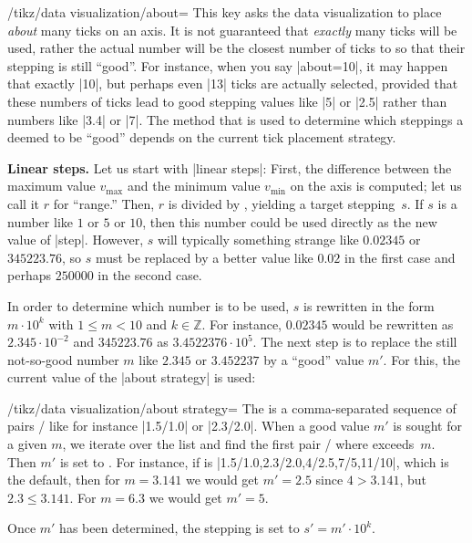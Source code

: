 \begin{key}{/tikz/data visualization/about=}
  This key asks the data visualization to place \emph{about}
   many ticks on an axis. It is not guaranteed that
  \emph{exactly}  many ticks will be used, rather the
  actual number will be the closest number of ticks to 
  so that their stepping is still ``good''. For instance, when you say
  |about=10|, it may happen that exactly |10|, but perhaps even |13| ticks are
  actually selected, provided that these numbers of ticks lead to good
  stepping values like |5| or |2.5| rather than numbers like |3.4| or
  |7|. The method that is used to determine which steppings a deemed to
  be ``good'' depends on the current tick placement strategy.

  \medskip
  \textbf{Linear steps.}
  Let us start with |linear steps|: First, the difference between the
  maximum value $v_{\max}$ and the minimum value $v_{\min}$ on the
  axis is computed; let us call it $r$ for ``range.'' Then, $r$ is
  divided by ,
  yielding a target stepping~$s$. If $s$ is a number like $1$ or $5$
  or $10$, then this number could be used directly as the new value of
  |step|. However, $s$ will typically something strange like $0.02345$
  or $345223.76$, so $s$ must be replaced by a better value like $0.02$
  in the first case and perhaps $250000$ in the second case.

  In order to determine which number is to be used, $s$ is rewritten
  in the form $m \cdot 10^k$ with $1 \le m < 10$ and $k \in \mathbb
  Z$. For instance, $0.02345$ would be rewritten as $2.345 \cdot
  10^{-2}$ and $345223.76$ as $3.4522376 \cdot 10^5$. The next step
  is to replace the still not-so-good number $m$ like $2.345$ or
  $3.452237$ by a ``good'' value $m'$. For this, the current value of
  the |about strategy| is used:
  \begin{key}{/tikz/data visualization/about strategy=}
    The  is a comma-separated sequence of pairs
    / like for instance |1.5/1.0| or
    |2.3/2.0|. When a good value $m'$ is sought for a given $m$, we
    iterate over the list and find the first pair
    / where 
    exceeds~$m$. Then $m'$ is set to . For instance, if
     is |1.5/1.0,2.3/2.0,4/2.5,7/5,11/10|, which is the
    default, then for $m=3.141$ we would get $m'=2.5$ since $4 >
    3.141$, but $2.3 \le 3.141$. For $m=6.3$ we would get $m'=5$.
  \end{key}
  Once $m'$ has been determined, the stepping is set to $s' = m'
  \cdot 10^k$.


\end{key}
